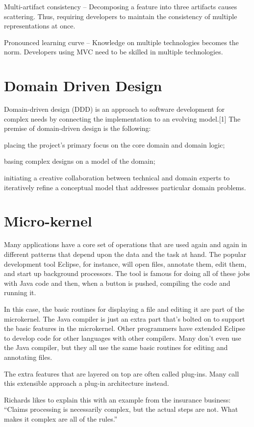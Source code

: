 \documentclass{book}
\begin{document}
    Multi-artifact consistency – Decomposing a feature into three artifacts causes scattering. Thus, requiring developers to maintain the consistency of multiple representations at once.

    Pronounced learning curve – Knowledge on multiple technologies becomes the norm. Developers using MVC need to be skilled in multiple technologies.

\chapter{Domain Driven Design}

Domain-driven design (DDD) is an approach to software development for complex needs by connecting the implementation to an evolving model.[1] The premise of domain-driven design is the following:

    placing the project's primary focus on the core domain and domain logic;

    basing complex designs on a model of the domain;

    initiating a creative collaboration between technical and domain experts to iteratively refine a conceptual model that addresses particular domain problems.

\chapter{Micro-kernel}
Many applications have a core set of operations that are used again and again in different patterns that depend upon the data and the task at hand.
The popular development tool Eclipse, for instance, will open files, annotate them, edit them, and start up background processors.
The tool is famous for doing all of these jobs with Java code and then, when a button is pushed, compiling the code and running it.

In this case, the basic routines for displaying a file and editing it are part of the microkernel.
The Java compiler is just an extra part that’s bolted on to support the basic features in the microkernel.
Other programmers have extended Eclipse to develop code for other languages with other compilers.
Many don’t even use the Java compiler, but they all use the same basic routines for editing and annotating files.

The extra features that are layered on top are often called plug-ins. Many call this extensible approach a plug-in architecture instead.

Richards likes to explain this with an example from the insurance business: “Claims processing is necessarily complex, but the actual steps are not. What makes it complex are all of the rules.”
\end{document}
